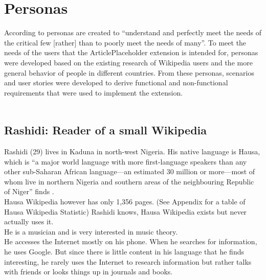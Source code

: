 \chapter{Personas}

According to \citet[182]{design:01} personas are created to ``understand and perfectly meet the needs of the critical few [rather] than to poorly meet the needs of many''. To meet the needs of the users that the ArticlePlaceholder extension is intended for, personas were developed based on the existing research of Wikipedia users and the more general behavior of people in different countries.  From these personas, scenarios and user stories were developed to derive functional and non-functional requirements that were used to implement the extension. \\
\\
\section{Rashidi: Reader of a small Wikipedia}
Rashidi (29) lives in Kaduna in north-west Nigeria. His native language is Hausa, which is ``a major world language with more first-language speakers than any other sub-Saharan African language---an estimated 30 million or more---most of whom live in northern Nigeria and southern areas of the neighbouring Republic of Niger'' finds \citet[1]{hausa}. \\
Hausa Wikipedia however has only 1,356 pages. (See Appendix for a table of Hausa Wikipedia Statistic) Rashidi knows, Hausa Wikipedia exists but never actually uses it. \\
He is a musician and is very interested in music theory. \\
He accesses the Internet mostly on his phone. When he searches for information, he uses Google. But since there is little content in his language that he finds interesting, he rarely uses the Internet to research information but rather talks with friends or looks things up in journals and books.



